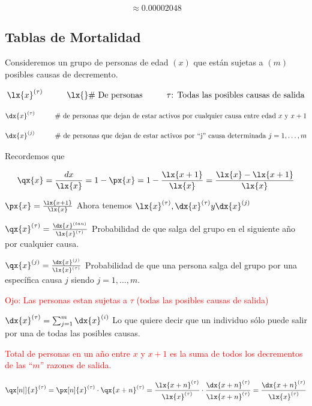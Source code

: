 \documentclass[12pt, a4paper, footinclude=true]{scrbook}
\begin{document}
	\[
	\approx 0.00002048
	\]
	
	\subsection{Tablas de Mortalidad}
	
	Consideremos un grupo de personas de edad $(x)$ que están sujetas a $(m)$ posibles causas de decremento. 
	
	$$ \lx{x}^{(\tau)} \hspace{1cm} \lx{} \text{\# De personas} \hspace{1cm} \tau \text{: Todas las posibles causas de salida}$$
	
	$$ \dx{x}^{(\tau)} \hspace{1cm} \text{\# de personas que dejan de estar activos por cualquier causa entre edad $x$ y $x+1$}$$
	
	$$ \dx{x}^{(j)} \hspace{1cm} \text{\# de personas que dejan de estar activos por ``j'' causa determinada $j=1, \dots , m$} $$
	
	Recordemos que 
	
	$$ \qx{x} = \frac{dx}{\lx{x}} = 1 - \px{x} = 1 - \frac{\lx{x+1}}{\lx{x}} = \frac{\lx{x} - \lx{x+1}}{\lx{x}}$$
	
	$\px{x} = \frac{\lx{x+1}}{\lx{x}}$ Ahora tenemos $\lx{x}^{(\tau)}, \dx{x}^{(\tau)} y \dx{x}^{(j)}$
	
	$\qx{x}^{(\tau)} = \frac{\dx{x}^{(tau)}}{\lx{x}^{(\tau)}}$ Probabilidad de que salga del grupo en el siguiente año por cualquier causa.
	
	$\qx{x}^{(j)} = \frac{\dx{x}^{(j)}}{\lx{x}^{(\tau)}}$ Probabilidad de que una persona salga del grupo por una específica causa $j$ siendo $j= 1, \dots, m$. 
	
	\textcolor{red}{ Ojo: Las personas estan sujetas a $\tau$ (todas las posibles causas de salida)}
	
	$\dx{x}^{(\tau)} = \sum_{j=1}^m \dx{x}^{(i)}$ Lo que quiere decir que un individuo sólo puede salir por una de todas las posibles causas. 
	
	\textcolor{red}{Total de personas en un año entre $x$ y $x+1$ es la suma de todos los decrementos de las ``$m$'' razones de salida.}
	
	$$\qx[n|]{x}^{(\tau)} = \px[n]{x}^{(\tau)} \cdot \qx{x+n}^{(\tau)} = \frac{\lx{x+n}^{(\tau)}}{\lx{x}^{(\tau)}} \cdot \frac{\dx{x+n}^{(\tau)}}{\lx{x+n}^{(\tau)}} = \frac{\dx{x+n}^{(\tau)}}{\lx{x}^{(\tau)}}$$
	
\end{document}
